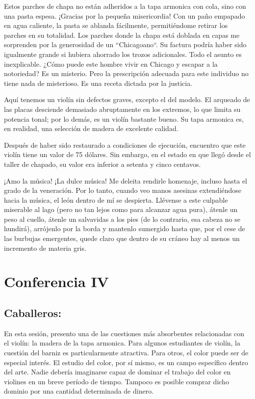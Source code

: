\documentclass[12pt]{book}
\begin{document}
Estos parches de chapa no están adheridos a la tapa armonica con cola, sino con una pasta espesa. ¡Gracias por la pequeña misericordia! Con un paño empapado en agua caliente, la pasta se ablanda fácilmente, permitiéndome retirar los parches en su totalidad. Los parches donde la chapa está doblada en capas me sorprenden por la generosidad de un ``Chicagoano``. Su factura podría haber sido igualmente grande si hubiera ahorrado los trozos adicionales. Todo el asunto es inexplicable. ¿Cómo puede este hombre vivir en Chicago y escapar a la notoriedad? Es un misterio. Pero la prescripción adecuada para este individuo no tiene nada de misterioso. Es una receta dictada por la justicia.

Aquí tenemos un violín sin defectos graves, excepto el del modelo. El arqueado de las placas desciende demasiado abruptamente en los extremos, lo que limita su potencia tonal; por lo demás, es un violín bastante bueno. Su tapa armonica es, en realidad, una selección de madera de excelente calidad.

Después de haber sido restaurado a condiciones de ejecución, encuentro que este violín tiene un valor de 75 dólares. Sin embargo, en el estado en que llegó desde el taller de chapado, su valor era inferior a setenta y cinco centavos. 

¡Amo la música! ¡La dulce música! Me deleita rendirle homenaje, incluso hasta el grado de la veneración. Por lo tanto, cuando veo manos asesinas extendiéndose hacia la música, el león dentro de mí se despierta. Llévense a este culpable miserable al lago (pero no tan lejos como para alcanzar agua pura), átenle un peso al cuello, átenle un salvavidas a los pies (de lo contrario, esa cabeza no se hundirá), arrójenlo por la borda y mantenlo sumergido hasta que, por el cese de las burbujas emergentes, quede claro que dentro de su cráneo hay al menos un incremento de materia gris.

\chapter{Conferencia IV}

\section*{Caballeros:}

En esta sesión, presento una de las cuestiones más absorbentes relacionadas con el violín: la madera de la tapa armonica. Para algunos estudiantes de violín, la cuestión del barniz es particularmente atractiva. Para otros, el color puede ser de especial interés. El estudio del color, por sí mismo, es un campo específico dentro del arte. Nadie debería imaginarse capaz de dominar el trabajo del color en violines en un breve período de tiempo. Tampoco es posible comprar dicho dominio por una cantidad determinada de dinero.
\end{document}
